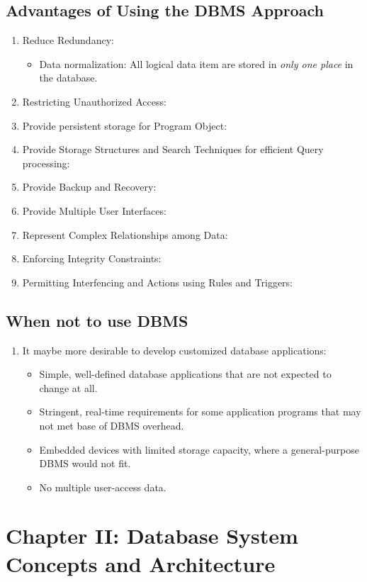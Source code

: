 \documentclass[10pt]{article}
\newcommand{\ti}{\textit}
\begin{document}
\subsection{Advantages of Using the DBMS Approach}
\begin{enumerate}
	\item Reduce Redundancy:
	\begin{itemize}
		\item Data normalization: All logical data item are stored in \ti{only one place} in the database.
	\end{itemize} 

	\item Restricting Unauthorized Access:
	\item Provide persistent storage for Program Object:
	\item Provide Storage Structures and Search Techniques for efficient Query processing:
	\item Provide Backup and Recovery:
	\item Provide Multiple User Interfaces:
	\item Represent Complex Relationships among Data:
	\item Enforcing Integrity Constraints:
	\item Permitting Interfencing and Actions using Rules and Triggers:
\end{enumerate}

\subsection{When not to use DBMS}
\begin{enumerate}
	\item It maybe more desirable to develop customized database applications:
	\begin{itemize}
		\item Simple, well-defined database applications that are not expected to change at all.
		\item Stringent, real-time requirements for some application programs that may not met base of DBMS overhead.
		\item Embedded devices with limited storage capacity, where a general-purpose DBMS would not fit.
		\item No multiple user-access data.
	\end{itemize}
\end{enumerate}

\bigbreak
\section{Chapter II: Database System Concepts and Architecture}
\end{document}
